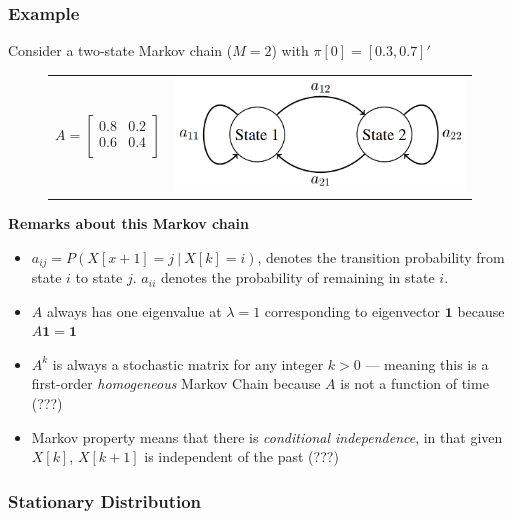 \documentclass{report}
\begin{document}
\subsubsection*{Example}
Consider a two-state Markov chain ($M=2$) with $\pi[0] = [0.3, 0.7]'$

\begin{figure}[ht!]

\begin{tabular}{cc}
$A = \begin{bmatrix}
0.8 & 0.2 \\
0.6 & 0.4 \\
\end{bmatrix}$ & \includegraphics[scale=0.5]{m1.png}
\end{tabular}

\end{figure}

\textbf{Remarks about this Markov chain} \begin{itemize}
\item $a_{ij} = P(X[x+1] = j\ |\ X[k]=i)$, denotes the transition probability from state $i$ to state $j$. $a_{ii}$ denotes the probability of remaining in state $i$.

\item $A$ always has one eigenvalue at $\lambda = 1$ corresponding to eigenvector $\mathbf{1}$ because $A \mathbf{1} = \mathbf{1}$
\item $A^k$ is always a stochastic matrix for any integer  $k > 0$ --- meaning this is a first-order \textit{homogeneous} Markov Chain because $A$ is not a function of time (???)
\item Markov property means that there is \textit{conditional independence}, in that given $X[k]$, $X[k+1]$ is independent of the past (???)
\end{itemize}

\subsubsection{Stationary Distribution}
\end{document}
